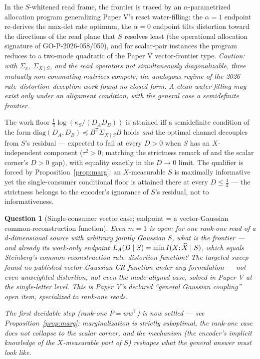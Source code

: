 \documentclass[11pt]{article}
\newtheorem{question}{Question}\newtheorem{remark}{Remark}
\begin{document}
\begin{conjecture}\label{conj:frontier}
In the $S$-whitened read frame, the frontier is traced by an
$\alpha$-parametrized allocation program generalizing Paper V's reset
water-filling: the $\alpha=1$ endpoint re-derives the max-det rate optimum,
the $\alpha=0$ endpoint tilts distortion toward the directions of the read
plane that $S$ resolves least (the operational allocation signature of
GO-P-2026-058/059), and for scalar-pair instances the program reduces to a
two-mode quadratic of the Paper V vector-frontier type. \emph{Caution: with
$\Sigma_x$, $\Sigma_{X\mid S}$, and the read operators not simultaneously
diagonalizable, three mutually non-commuting matrices compete; the
analogous regime of the 2026 rate--distortion--deception work found no
closed form. A clean water-filling may exist only under an alignment
condition, with the general case a semidefinite frontier.}
\end{conjecture}

\begin{conjecture}\label{conj:tight}
The work floor $\tfrac12\log(\kappa_S/(D_AD_B))$ is attained iff a
semidefinite condition of the form
$\mathrm{diag}(D_A,D_B)\preceq B^{\mathsf T}\Sigma_{X\mid S}B$ holds
\emph{and} the optimal channel decouples from $S$'s residual --- expected
to fail at every $D>0$ when $S$ has an $X$-independent component
($\tau^2>0$; matching the strictness remark of \cite{bondtaxnote} and the
scalar corner's $D>0$ gap), with equality exactly in the $D\to0$ limit.
The qualifier is forced by Proposition~\ref{prop:marg}: an $X$-measurable
$S$ is maximally informative yet the single-consumer conditional floor is
attained there at every $D\le\tfrac12$ --- the strictness belongs to the
encoder's ignorance of $S$'s residual, not to informativeness.
\end{conjecture}

\begin{question}[Single-consumer vector case; endpoint = a vector-Gaussian
common-reconstruction function]\label{q:single}
Even $m=1$ is open: for one rank-one read of a $d$-dimensional source with
\emph{arbitrary} jointly Gaussian $S$, what is the frontier --- and already
its work-only endpoint $L_A(D\mid S)=\min I(X;\widehat X\mid S)$, which equals
Steinberg's common-reconstruction rate--distortion function? The targeted
sweep found \emph{no published vector-Gaussian CR function under any
formulation} --- not even unweighted distortion, not even the mode-aligned
case, solved in Paper V at the single-letter level. This is Paper V's declared ``general Gaussian
coupling'' open item, specialized to rank-one reads.

\emph{The first decidable step (rank-one $P=ww^{\mathsf T}$) is now
settled} --- see Proposition~\ref{prop:marg}: marginalization is strictly
suboptimal, the rank-one case does \emph{not} collapse to the scalar
corner, and the mechanism (the encoder's implicit knowledge of the
$X$-measurable part of $S$) reshapes what the general answer must look
like.
\end{question}
\end{document}
